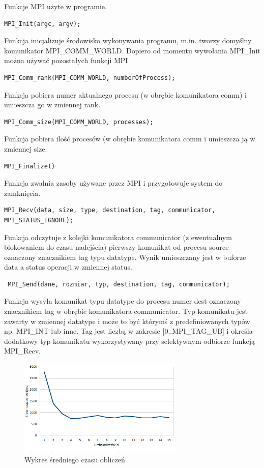 \documentclass[a4paper,10pt]{article}
\begin{document}
Funkcje MPI użyte w programie.
\begin{lstlisting}
MPI_Init(argc, argv);
\end{lstlisting}
Funkcja inicjalizuje środowisko wykonywania programu, m.in. tworzy domyślny komunikator \newline MPI\_COMM\_WORLD. Dopiero od momentu wywołania MPI\_Init można używać pozostałych funkcji MPI
\begin{lstlisting}
MPI_Comm_rank(MPI_COMM_WORLD, numberOfProcess);
\end{lstlisting}
Funkcja pobiera numer aktualnego procesu (w obrębie komunikatora comm) i umieszcza go w zmiennej rank.
\begin{lstlisting}
MPI_Comm_size(MPI_COMM_WORLD, processes);
\end{lstlisting}
Funkcja pobiera ilość procesów (w obrębie komunikatora comm i umieszcza ją w zmiennej size.
\begin{lstlisting}
MPI_Finalize()
\end{lstlisting}
Funkcja zwalnia zasoby używane przez MPI i przygotowuje system do zamknięcia.

\begin{lstlisting}
MPI_Recv(data, size, type, destination, tag, communicator, MPI_STATUS_IGNORE);
\end{lstlisting}
Funkcja odczytuje z kolejki komunikatora communicator (z ewentualnym blokowaniem do czasu nadejścia) pierwszy komunikat od procesu source oznaczony znacznikiem tag typu datatype. Wynik umieszczany jest w buforze data a status operacji w zmiennej status.

\begin{lstlisting}
 MPI_Send(dane, rozmiar, typ, destination, tag, communicator);
\end{lstlisting}
Funkcja wysyła komunikat typu datatype do procesu numer dest oznaczony znacznikiem tag w obrębie komunikatora communicator.
Typ komunikatu jest zawarty w zmiennej datatype i może to być którymś z predefiniowanych typów np.  MPI\_INT lub inne. Tag jest liczbą w zakresie [0..MPI\_TAG\_UB] i określa dodatkowy typ komunikatu wykorzystywany przy selektywnym odbiorze funkcją MPI\_Recv.

\begin{figure}[!ht]
	\centering
 \includegraphics[width=0.7\textwidth]{1.png}
  \caption{Wykres średniego czasu obliczeń}
\end{figure}
\end{document}
